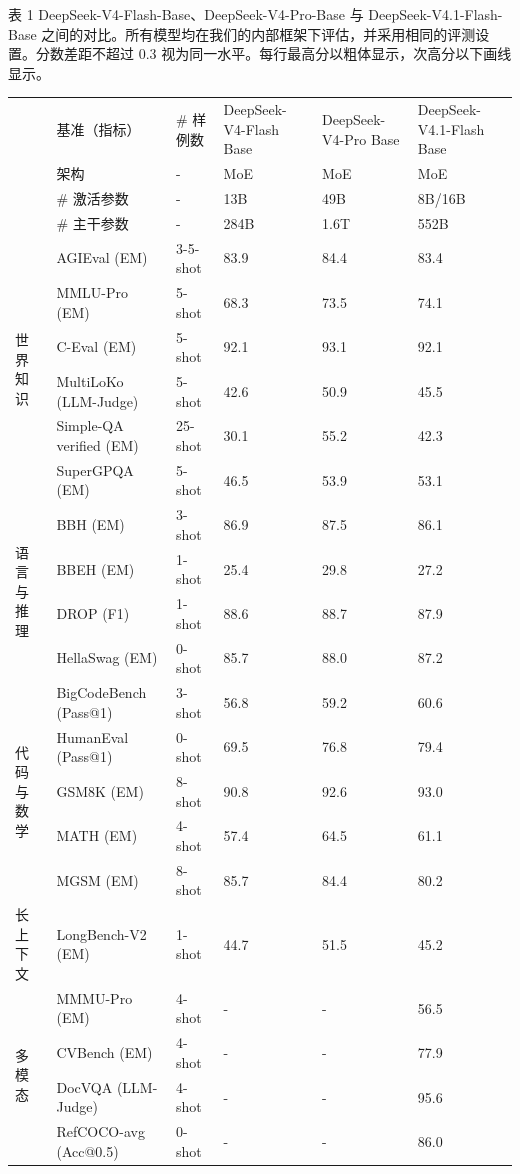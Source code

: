 表 1 \textbar{} DeepSeek-V4-Flash-Base、DeepSeek-V4-Pro-Base 与 DeepSeek-V4.1-Flash-Base 之间的对比。所有模型均在我们的内部框架下评估，并采用相同的评测设置。分数差距不超过 0.3 视为同一水平。每行最高分以粗体显示，次高分以下画线显示。

{\def\LTcaptype{none} %
\begin{longtable}[]{@{}llllll@{}}
\toprule\noalign{}
\endhead
\bottomrule\noalign{}
\endlastfoot
& 基准（指标） & \# 样例数 & DeepSeek-V4-Flash Base &
DeepSeek-V4-Pro Base & DeepSeek-V4.1-Flash Base \\
\multirow{3}{*}{} & 架构 & - & MoE & MoE & MoE \\
& \# 激活参数 & - & 13B & 49B & 8B/16B \\
& \# 主干参数 & - & 284B & 1.6T & 552B \\
\multirow{6}{*}{世界知识} & AGIEval (EM) & 3-5-shot & 83.9 & 84.4 &
83.4 \\
& MMLU-Pro (EM) & 5-shot & 68.3 & 73.5 & 74.1 \\
& C-Eval (EM) & 5-shot & 92.1 & 93.1 & 92.1 \\
& MultiLoKo (LLM-Judge) & 5-shot & 42.6 & 50.9 & 45.5 \\
& Simple-QA verified (EM) & 25-shot & 30.1 & 55.2 & 42.3 \\
& SuperGPQA (EM) & 5-shot & 46.5 & 53.9 & 53.1 \\
\multirow{4}{*}{语言与推理} & BBH (EM) & 3-shot & 86.9 & 87.5 &
86.1 \\
& BBEH (EM) & 1-shot & 25.4 & 29.8 & 27.2 \\
& DROP (F1) & 1-shot & 88.6 & 88.7 & 87.9 \\
& HellaSwag (EM) & 0-shot & 85.7 & 88.0 & 87.2 \\
\multirow{5}{*}{代码与数学} & BigCodeBench (Pass@1) & 3-shot & 56.8 &
59.2 & 60.6 \\
& HumanEval (Pass@1) & 0-shot & 69.5 & 76.8 & 79.4 \\
& GSM8K (EM) & 8-shot & 90.8 & 92.6 & 93.0 \\
& MATH (EM) & 4-shot & 57.4 & 64.5 & 61.1 \\
& MGSM (EM) & 8-shot & 85.7 & 84.4 & 80.2 \\
长上下文 & LongBench-V2 (EM) & 1-shot & 44.7 & 51.5 & 45.2 \\
\multirow{4}{*}{多模态} & MMMU-Pro (EM) & 4-shot & - & - & 56.5 \\
& CVBench (EM) & 4-shot & - & - & 77.9 \\
& DocVQA (LLM-Judge) & 4-shot & - & - & 95.6 \\
& RefCOCO-avg (Acc@0.5) & 0-shot & - & - & 86.0 \\
\end{longtable}
}


